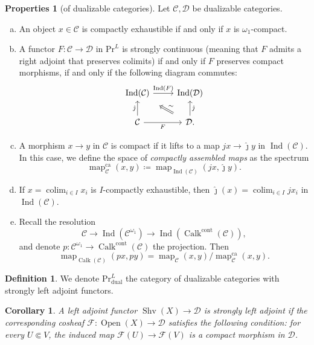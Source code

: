 \documentclass[draft]{amsart}
\newcommand{\jhat}{\hat\jmath}
\newcommand{\cat}[1]{\mathcal{#1}}
\newcommand{\sheaf}[1]{\mathcal{#1}}
\newcommand{\ssubset}{\Subset}
\renewcommand{\Pr}{\mathrm{Pr}}
\DeclareMathOperator{\Ind}{Ind}
\DeclareMathOperator{\Open}{Open}
\DeclareMathOperator{\map}{map}
\DeclareMathOperator{\Shv}{Shv}
\DeclareMathOperator{\Calk}{Calk}
\DeclareMathOperator*{\colim}{colim}
\newtheorem{cor}[thm]{Corollary}
\theoremstyle{definition}
\newtheorem{defn}[thm]{Definition}
\newtheorem{properties}[thm]{Properties}
\begin{document}
\begin{properties}[of dualizable categories]
Let $\cat C, \cat D$ be dualizable categories.
\begin{enumerate}[(a)]
\item An object $x\in \cat C$ is compactly exhaustible if and only if $x$ is $\omega_1$-compact.

\item A functor $F\colon \cat C\to \cat D$ in $\Pr^L$ is strongly continuous (meaning that $F$ admits a right adjoint that preserves colimits) if and only if $F$ preserves compact morphisms, if and only if the following diagram commutes:
\[
\begin{tikzcd}
\Ind(\cat C) \ar[r,"\Ind(F)"] & \Ind(\cat D) \\
\cat C \ar[u,"\jhat"] \ar[r,"F"'] & \cat D \ar[ul,Rightarrow,shorten=4mm, "\sim"'] \ar[u,"\jhat"'].
\end{tikzcd}
\]

\item A morphism $x\to y$ in $\cat C$ is compact if it lifts to a map $jx \to \jhat y$ in $\Ind(\cat C)$. In this case, we define the space of \emph{compactly assembled maps} as the spectrum
\[
\map_{\cat C}^{\mathrm{ca}}(x,y)\coloneqq \map_{\Ind(\cat C)}(jx, \jhat y).
\]

\item If $x = \colim_{i\in I} x_i$ is $I$-compactly exhaustible, then $\jhat(x) = \colim_{i\in I} jx_i$ in $\Ind(\cat C)$.

\item Recall the resolution 
\[
\cat C \to \Ind(\cat C^{\omega_1}) \to \Ind(\Calk^{\mathrm{cont}}(\cat C)),
\]
and denote $p\colon \cat C^{\omega_1} \to \Calk^{\mathrm{cont}}(\cat C)$ the projection. Then
\[
\map_{\Calk(\cat C)}(px, py) = \map_{\cat C}(x,y) / \map_{\cat C}^{\mathrm{ca}} (x,y).
\]
\end{enumerate}
\end{properties}

\begin{defn}
We denote $\Pr^L_{\mathrm{dual}}$ the category of dualizable categories with strongly left adjoint functors.
\end{defn}

\begin{cor}
A left adjoint functor $\Shv(X) \to \cat D$ is strongly left adjoint if the corresponding cosheaf $\sheaf F\colon \Open(X) \to \cat D$ satisfies the following condition: for every $U\ssubset V$, the induced map $\sheaf F(U) \to \sheaf F(V)$ is a compact morphism in $\cat D$.
\end{cor}
\end{document}
